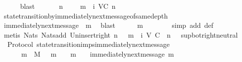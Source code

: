\begin{isabellebody}
\ \ \ \ \isamarkupfalse%
\ blast\isanewline
\ \ \isamarkupfalse%
\ \isamarkupfalse%
\ {\isachardoublequoteopen}{\isasymexists}\ n\ {\isasymin}\ {\isasymnat}{\isachardot}\ {\isasymsigma}\ {\isasymunion}\ {\isacharbraceleft}m{\isacharbraceright}\ {\isasymin}\ {\isasymSigma}{\isacharunderscore}i\ {\isacharparenleft}V{\isacharcomma}C{\isacharcomma}{\isasymepsilon}{\isacharparenright}\ {\isacharparenleft}n\ {\isacharplus}\ {}{\isacharparenright}{\isachardoublequoteclose}\isanewline
\ \ \ \ \isamarkupfalse%
\ state{\isacharunderscore}transition{\isacharunderscore}by{\isacharunderscore}immediately{\isacharunderscore}next{\isacharunderscore}message{\isacharunderscore}of{\isacharunderscore}same{\isacharunderscore}depth\isanewline
\ \ \ \ \isamarkupfalse%
\ {\isacartoucheopen}immediately{\isacharunderscore}next{\isacharunderscore}message\ {\isacharparenleft}{\isasymsigma}{\isacharcomma}\ m{\isacharparenright}{\isacartoucheclose}\ \isamarkupfalse%
\ blast\isanewline
\ \ \isamarkupfalse%
\ {\isachardoublequoteopen}{\isasymsigma}\ {\isasymunion}\ {\isacharbraceleft}m{\isacharbraceright}\ {\isasymin}\ {\isasymSigma}{\isachardoublequoteclose}\isanewline
\ \ \ \ \isamarkupfalse%
\ {\isacharparenleft}simp\ add{\isacharcolon}\ {\isasymSigma}{\isacharunderscore}def{\isacharparenright}\isanewline
\ \ \ \ \isamarkupfalse%
\ {\isacharparenleft}metis\ Nats{\isacharunderscore}{}\ Nats{\isacharunderscore}add\ Un{\isacharunderscore}insert{\isacharunderscore}right\ {\isacartoucheopen}{\isasymexists}n{\isasymin}{\isasymnat}{\isachardot}\ {\isasymsigma}\ {\isasymunion}\ {\isacharbraceleft}m{\isacharbraceright}\ {\isasymin}\ {\isasymSigma}{\isacharunderscore}i\ {\isacharparenleft}V{\isacharcomma}\ C{\isacharcomma}\ {\isasymepsilon}{\isacharparenright}\ {\isacharparenleft}n\ {\isacharplus}\ {}{\isacharparenright}{\isacartoucheclose}\ sup{\isacharunderscore}bot{\isachardot}right{\isacharunderscore}neutral{\isacharparenright}\isanewline
{}\isamarkupfalse%
%
\endisatagproof
{\isafoldproof}%
%
\isadelimproof
\isanewline
%
\endisadelimproof
\isanewline
{}\isamarkupfalse%
\ {\isacharparenleft}\ Protocol{\isacharparenright}\ state{\isacharunderscore}transition{\isacharunderscore}imps{\isacharunderscore}immediately{\isacharunderscore}next{\isacharunderscore}message{\isacharcolon}\ \isanewline
\ \ {\isachardoublequoteopen}{\isasymforall}\ {\isasymsigma}\ {\isasymin}{\isasymSigma}{\isachardot}\ {\isasymforall}\ m\ {\isasymin}\ M{\isachardot}\ {\isasymsigma}\ {\isasymunion}\ {\isacharbraceleft}m{\isacharbraceright}\ {\isasymin}\ {\isasymSigma}\ {\isasymand}\ m\ {\isasymnotin}\ {\isasymsigma}\ {\isasymlongrightarrow}\ immediately{\isacharunderscore}next{\isacharunderscore}message\ {\isacharparenleft}{\isasymsigma}{\isacharcomma}m{\isacharparenright}{\isachardoublequoteclose}\isanewline

\end{isabellebody}
